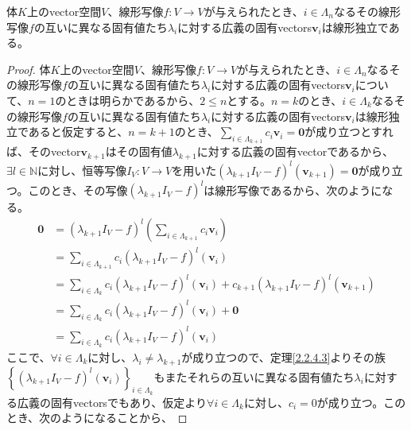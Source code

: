 \documentclass[dvipdfmx]{jsarticle}
\begin{document}
\begin{thm}
\label{2.2.4.4}
体$K$上のvector空間$V$、線形写像$f:V \rightarrow V$が与えられたとき、$i \in \varLambda_{n}$なるその線形写像$f$の互いに異なる固有値たち$\lambda_{i}$に対する広義の固有vectors$\mathbf{v}_{i}$は線形独立である。
\end{thm}
\begin{proof}
体$K$上のvector空間$V$、線形写像$f:V \rightarrow V$が与えられたとき、$i \in \varLambda_{n}$なるその線形写像$f$の互いに異なる固有値たち$\lambda_{i}$に対する広義の固有vectors$\mathbf{v}_{i}$について、$n = 1$のときは明らかであるから、$2 \leq n$とする。$n = k$のとき、$i \in \varLambda_{k}$なるその線形写像$f$の互いに異なる固有値たち$\lambda_{i}$に対する広義の固有vectors$\mathbf{v}_{i}$は線形独立であると仮定すると、$n = k + 1$のとき、$\sum_{i \in \varLambda_{k + 1}} {c_{i}\mathbf{v}_{i}} = \mathbf{0}$が成り立つとすれば、そのvector$\mathbf{v}_{k + 1}$はその固有値$\lambda_{k + 1}$に対する広義の固有vectorであるから、$\exists l \in \mathbb{N}$に対し、恒等写像$I_{V}:V \rightarrow V$を用いた$\left( \lambda_{k + 1}I_{V} - f \right)^{l}\left( \mathbf{v}_{k + 1} \right) = \mathbf{0}$が成り立つ。このとき、その写像$\left( \lambda_{k + 1}I_{V} - f \right)^{l}$は線形写像であるから、次のようになる。
\begin{align*}
\mathbf{0} &= \left( \lambda_{k + 1}I_{V} - f \right)^{l}\left( \sum_{i \in \varLambda_{k + 1}} {c_{i}\mathbf{v}_{i}} \right)\\
&= \sum_{i \in \varLambda_{k + 1}} {c_{i}\left( \lambda_{k + 1}I_{V} - f \right)^{l}\left( \mathbf{v}_{i} \right)}\\
&= \sum_{i \in \varLambda_{k}} {c_{i}\left( \lambda_{k + 1}I_{V} - f \right)^{l}\left( \mathbf{v}_{i} \right)} + c_{k + 1}\left( \lambda_{k + 1}I_{V} - f \right)^{l}\left( \mathbf{v}_{k + 1} \right)\\
&= \sum_{i \in \varLambda_{k}} {c_{i}\left( \lambda_{k + 1}I_{V} - f \right)^{l}\left( \mathbf{v}_{i} \right)} + \mathbf{0}\\
&= \sum_{i \in \varLambda_{k}} {c_{i}\left( \lambda_{k + 1}I_{V} - f \right)^{l}\left( \mathbf{v}_{i} \right)}
\end{align*}
ここで、$\forall i \in \varLambda_{k}$に対し、$\lambda_{i} \neq \lambda_{k + 1}$が成り立つので、定理\ref{2.2.4.3}よりその族$\left\{ \left( \lambda_{k + 1}I_{V} - f \right)^{l}\left( \mathbf{v}_{i} \right) \right\}_{i \in \varLambda_{k}} $もまたそれらの互いに異なる固有値たち$\lambda_{i}$に対する広義の固有vectorsでもあり、仮定より$\forall i \in \varLambda_{k}$に対し、$c_{i} = 0$が成り立つ。このとき、次のようになることから、

\end{proof}
\end{document}
